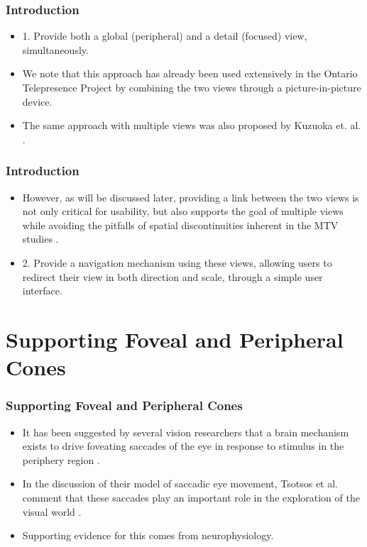 \documentclass{beamer}
\begin{document}
\begin{frame}
\frametitle{Introduction}

\begin{itemize}
\item 1. Provide both a global (peripheral) and a detail (focused) view, simultaneously.
\item We note that this approach has already been used extensively in the Ontario Telepresence Project    by combining the two views through a picture-in-picture device.
\item The same approach with multiple views was also proposed by Kuzuoka et. al. .
\end{itemize}

\end{frame}

\begin{frame}
\frametitle{Introduction}

\begin{itemize}
\item However, as will be discussed later, providing a link between the two views is not only critical for usability, but also supports the goal of multiple views while avoiding the pitfalls of spatial discontinuities inherent in the MTV studies  .
\item 2. Provide a navigation mechanism using these views, allowing users to redirect their view in both direction and scale, through a simple user interface.
\end{itemize}

\end{frame}

\section[Supporting Foveal and Peripheral Cones]{Supporting Foveal and Peripheral Cones}


\begin{frame}
\frametitle{Supporting Foveal and Peripheral Cones}

\begin{itemize}
\item It has been suggested by several vision researchers that a brain mechanism exists to drive foveating saccades of the eye in response to stimulus in the periphery region  .
\item In the discussion of their model of saccadic eye movement, Tsotsos et al. comment that these saccades play an important role in the exploration of the visual world .
\item Supporting evidence for this comes from neurophysiology.
\end{itemize}

\end{frame}
\end{document}
